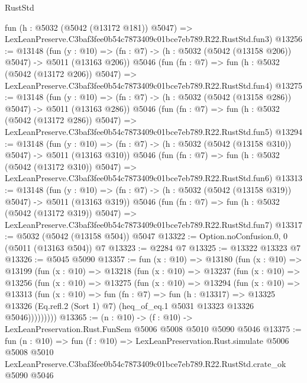 \begin{lexlean}{RustStd}
\begin{coremodule}
    fun (h : @5032 (@5042 (@13172 @181)) @5047) =>
    LexLeanPreserve.C3baf3fee0b54c7873409c01bce7eb789.R22.RustStd.fun3)
@13256 := @13148
    (fun (y : @10) => (fn : @7) -> (h : @5032 (@5042 (@13158 @206)) @5047) -> @5011 (@13163 @206))
    @5046
    (fun (fn : @7) =>
    fun (h : @5032 (@5042 (@13172 @206)) @5047) =>
    LexLeanPreserve.C3baf3fee0b54c7873409c01bce7eb789.R22.RustStd.fun4)
@13275 := @13148
    (fun (y : @10) => (fn : @7) -> (h : @5032 (@5042 (@13158 @286)) @5047) -> @5011 (@13163 @286))
    @5046
    (fun (fn : @7) =>
    fun (h : @5032 (@5042 (@13172 @286)) @5047) =>
    LexLeanPreserve.C3baf3fee0b54c7873409c01bce7eb789.R22.RustStd.fun5)
@13294 := @13148
    (fun (y : @10) => (fn : @7) -> (h : @5032 (@5042 (@13158 @310)) @5047) -> @5011 (@13163 @310))
    @5046
    (fun (fn : @7) =>
    fun (h : @5032 (@5042 (@13172 @310)) @5047) =>
    LexLeanPreserve.C3baf3fee0b54c7873409c01bce7eb789.R22.RustStd.fun6)
@13313 := @13148
    (fun (y : @10) => (fn : @7) -> (h : @5032 (@5042 (@13158 @319)) @5047) -> @5011 (@13163 @319))
    @5046
    (fun (fn : @7) =>
    fun (h : @5032 (@5042 (@13172 @319)) @5047) =>
    LexLeanPreserve.C3baf3fee0b54c7873409c01bce7eb789.R22.RustStd.fun7)
@13317 := @5032 (@5042 (@13158 @504)) @5047
@13322 := Option.noConfusion.{0, 0} (@5011 (@13163 @504)) @7
@13323 := @2284 @7
@13325 := @13322 @13323 @7
@13326 := @5045 @5090
@13357 := fun (x : @10) =>
  @13180
    (fun (x : @10) =>
    @13199
      (fun (x : @10) =>
      @13218
        (fun (x : @10) =>
        @13237
          (fun (x : @10) =>
          @13256
            (fun (x : @10) =>
            @13275
              (fun (x : @10) =>
              @13294
                (fun (x : @10) =>
                @13313
                  (fun (x : @10) =>
                  fun (fn : @7) =>
                  fun (h : @13317) =>
                  @13325
                    @13326
                    (Eq.refl.{2} (Sort 1) @7)
                    (heq_of_eq.{1} @5031 @13323 @13326 @5046)))))))))
@13365 := (n : @10) -> (f : @10) -> LexLeanPreservation.Rust.FunSem @5006 @5008 @5010 @5090 @5046
@13375 := fun (n : @10) =>
  fun (f : @10) =>
  LexLeanPreservation.Rust.simulate
    @5006
    @5008
    @5010
    LexLeanPreserve.C3baf3fee0b54c7873409c01bce7eb789.R22.RustStd.crate_ok
    @5090
    @5046
\end{coremodule}
\end{lexlean}
